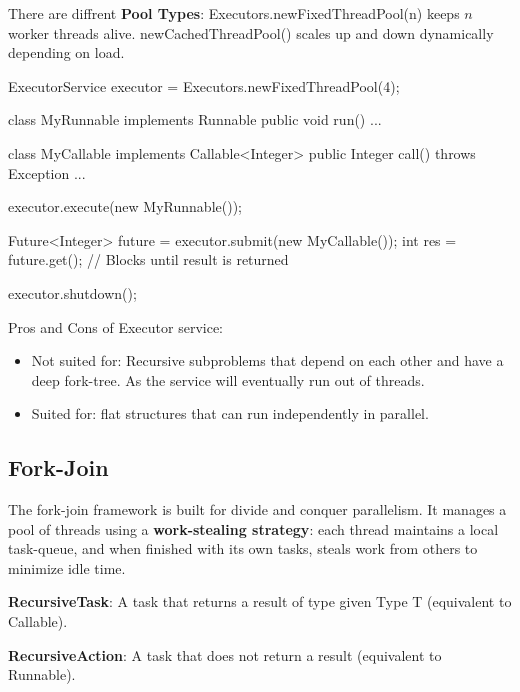 \begin{remark}
    There are diffrent \textbf{Pool Types}: Executors.newFixedThreadPool(n) keeps $n$ worker threads alive. newCachedThreadPool() scales up and down dynamically depending on load.
\end{remark}

\begin{codeexample}
ExecutorService executor = Executors.newFixedThreadPool(4);

class MyRunnable implements Runnable {
    public void run() {...}
}

class MyCallable implements Callable<Integer> {
    public Integer call() throws Exception {...}
}   

executor.execute(new MyRunnable());

Future<Integer> future = executor.submit(new MyCallable());
int res = future.get(); // Blocks until result is returned

executor.shutdown();
\end{codeexample}

Pros and Cons of Executor service:
\begin{itemize}
    \item Not suited for: Recursive subproblems that depend on each other and have a deep fork-tree. As the service will eventually run out of threads.
    \item Suited for: flat structures that can run independently in parallel.
\end{itemize}

\subsection{Fork-Join}

The fork-join framework is built for divide and conquer parallelism. It manages a pool of threads using a \textbf{work-stealing strategy}: each thread maintains a local task-queue, and when finished with its own tasks, steals work from others to minimize idle time.

\begin{definition}
    \textbf{RecursiveTask}: A task that returns a result of type given Type T (equivalent to Callable).
\end{definition}

\begin{definition}
    \textbf{RecursiveAction}: A task that does not return a result (equivalent to Runnable).
\end{definition}

